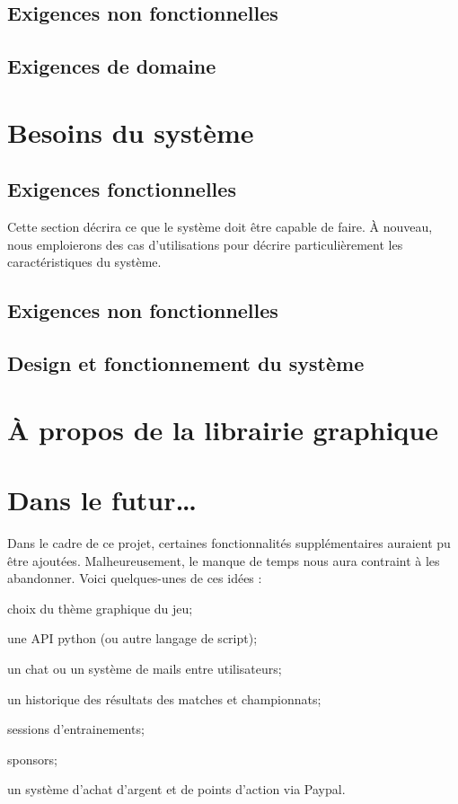 \documentclass[a4paper, 11pt]{report}
\begin{document}
\section{Exigences non fonctionnelles}



\section{Exigences de domaine}


\chapter{Besoins du système}
\section{Exigences fonctionnelles}
Cette section décrira ce que le système doit être capable de faire. À nouveau, nous emploierons des cas d'utilisations pour décrire particulièrement les caractéristiques du système.



\section{Exigences non fonctionnelles}


\section{Design et fonctionnement du système}



\appendix

\chapter{À propos de la librairie graphique}


\chapter{Dans le futur…}
Dans le cadre de ce projet, certaines fonctionnalités  supplémentaires auraient pu être ajoutées. 
Malheureusement, le manque de temps nous aura contraint à les abandonner. 
Voici quelques-unes de ces idées :
\begin{list}{}{\leftmargin=1.5em}
\item{choix du thème graphique du jeu;}
\item{une API python (ou autre langage de script);}
\item{un chat ou un système de mails entre utilisateurs;}
\item{un historique des résultats des matches et championnats;}
\item{sessions d'\gls{entrainement}s;}
\item{\gls{sponsor}s;}
\item{un système d'achat d'argent et de points d'action via Paypal.}
\end{list}
\end{document}
